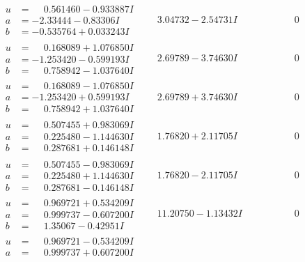 \documentclass[1p]{elsarticle_modified}
\theoremstyle{definition}
\begin{document}
$$\begin{array}{c|c|c}
\begin{aligned}
u &= \phantom{-}0.561460 - 0.933887 I \\
a &= -2.33444 - 0.83306 I \\
b &= -0.535764 + 0.033243 I\end{aligned}
 & \phantom{-}3.04732 - 2.54731 I & \phantom{-0.000000 } 0 \\ \hline\begin{aligned}
u &= \phantom{-}0.168089 + 1.076850 I \\
a &= -1.253420 - 0.599193 I \\
b &= \phantom{-}0.758942 - 1.037640 I\end{aligned}
 & \phantom{-}2.69789 - 3.74630 I & \phantom{-0.000000 } 0 \\ \hline\begin{aligned}
u &= \phantom{-}0.168089 - 1.076850 I \\
a &= -1.253420 + 0.599193 I \\
b &= \phantom{-}0.758942 + 1.037640 I\end{aligned}
 & \phantom{-}2.69789 + 3.74630 I & \phantom{-0.000000 } 0 \\ \hline\begin{aligned}
u &= \phantom{-}0.507455 + 0.983069 I \\
a &= \phantom{-}0.225480 - 1.144630 I \\
b &= \phantom{-}0.287681 + 0.146148 I\end{aligned}
 & \phantom{-}1.76820 + 2.11705 I & \phantom{-0.000000 } 0 \\ \hline\begin{aligned}
u &= \phantom{-}0.507455 - 0.983069 I \\
a &= \phantom{-}0.225480 + 1.144630 I \\
b &= \phantom{-}0.287681 - 0.146148 I\end{aligned}
 & \phantom{-}1.76820 - 2.11705 I & \phantom{-0.000000 } 0 \\ \hline\begin{aligned}
u &= \phantom{-}0.969721 + 0.534209 I \\
a &= \phantom{-}0.999737 - 0.607200 I \\
b &= \phantom{-}1.35067 - 0.42951 I\end{aligned}
 & \phantom{-}11.20750 - 1.13432 I & \phantom{-0.000000 } 0 \\ \hline\begin{aligned}
u &= \phantom{-}0.969721 - 0.534209 I \\
a &= \phantom{-}0.999737 + 0.607200 I \\

\end{aligned}
\end{array}$$
\end{document}
